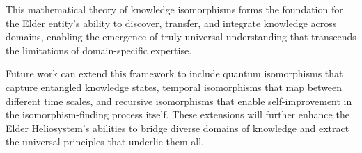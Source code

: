 This mathematical theory of knowledge isomorphisms forms the foundation for the Elder entity's ability to discover, transfer, and integrate knowledge across domains, enabling the emergence of truly universal understanding that transcends the limitations of domain-specific expertise.

Future work can extend this framework to include quantum isomorphisms that capture entangled knowledge states, temporal isomorphisms that map between different time scales, and recursive isomorphisms that enable self-improvement in the isomorphism-finding process itself. These extensions will further enhance the Elder Heliosystem's abilities to bridge diverse domains of knowledge and extract the universal principles that underlie them all.